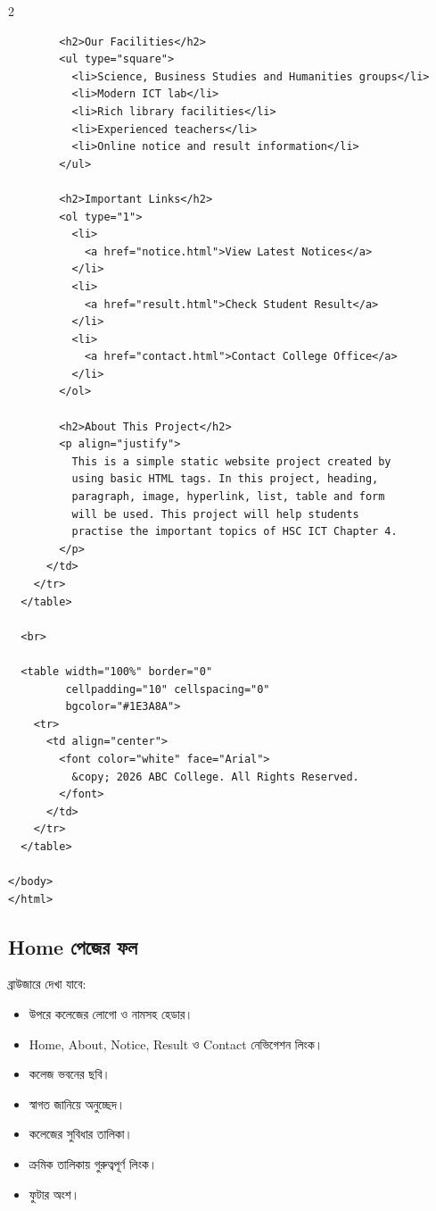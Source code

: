 \begin{multicols}{2}
\begin{verbatim}
        <h2>Our Facilities</h2>
        <ul type="square">
          <li>Science, Business Studies and Humanities groups</li>
          <li>Modern ICT lab</li>
          <li>Rich library facilities</li>
          <li>Experienced teachers</li>
          <li>Online notice and result information</li>
        </ul>

        <h2>Important Links</h2>
        <ol type="1">
          <li>
            <a href="notice.html">View Latest Notices</a>
          </li>
          <li>
            <a href="result.html">Check Student Result</a>
          </li>
          <li>
            <a href="contact.html">Contact College Office</a>
          </li>
        </ol>

        <h2>About This Project</h2>
        <p align="justify">
          This is a simple static website project created by
          using basic HTML tags. In this project, heading,
          paragraph, image, hyperlink, list, table and form
          will be used. This project will help students
          practise the important topics of HSC ICT Chapter 4.
        </p>
      </td>
    </tr>
  </table>

  <br>

  <table width="100%" border="0"
         cellpadding="10" cellspacing="0"
         bgcolor="#1E3A8A">
    <tr>
      <td align="center">
        <font color="white" face="Arial">
          &copy; 2026 ABC College. All Rights Reserved.
        </font>
      </td>
    </tr>
  </table>

</body>
</html>
\end{verbatim}
\end{multicols}


\subsection{Home পেজের ফল}

ব্রাউজারে দেখা যাবে:
\par\noindent
\begin{minipage}[t]{.48\linewidth}\vspace{0pt}
\begin{itemize}
\item উপরে কলেজের লোগো ও নামসহ হেডার।
\item Home, About, Notice, Result ও Contact নেভিগেশন লিংক।
\item কলেজ ভবনের ছবি।
\item স্বাগত জানিয়ে অনুচ্ছেদ।
\end{itemize}
\end{minipage}\hfill
\begin{minipage}[t]{.48\linewidth}\vspace{0pt}
\begin{itemize}
\item কলেজের সুবিধার তালিকা।
\item ক্রমিক তালিকায় গুরুত্বপূর্ণ লিংক।
\item ফুটার অংশ।
\end{itemize}
\end{minipage}\par


